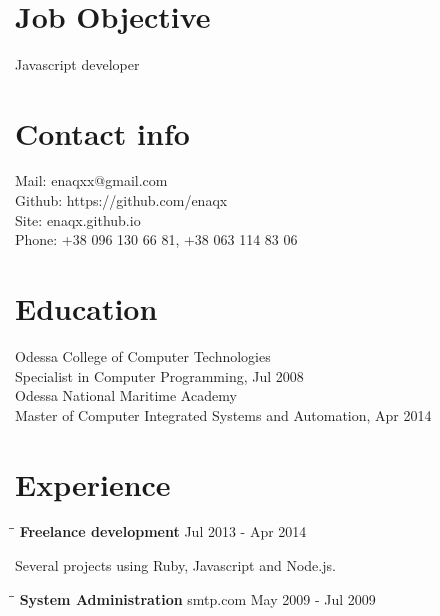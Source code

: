 \documentclass{res}
\begin{document}
 


\begin{resume}

\

\section{Job Objective}          
    Javascript developer   

\section{Contact info}    
    Mail:     enaqxx@gmail.com \\
    Github:   https://github.com/enaqx \\
    Site:     enaqx.github.io \\
    Phone:    +38 096 130 66 81,  +38 063 114 83 06 \\

\section{Education}          
    Odessa College of Computer Technologies  \\        
    Specialist in Computer Programming, Jul 2008   \\       
     
    Odessa National Maritime Academy \\        
    Master of Computer Integrated Systems and Automation, Apr 2014 \\     

 
\section{Experience}
   \vspace{-0.1in}	
   \begin{tabbing}
   \hspace{2.3in}\= \hspace{2.6in}\= \kill 
    {\bf Freelance development} \>     \>Jul 2013 - Apr 2014\\
                             \>
   \end{tabbing}\vspace{-20pt}     
    Several projects using Ruby, Javascript and Node.js.

   \begin{tabbing}
   \hspace{2.3in}\= \hspace{2.6in}\= \kill 
    {\bf System Administration} \>             smtp.com \> May 2009 - Jul 2009\\
                          \>
   \end{tabbing}\vspace{-20pt}


\end{resume}
\end{document}
